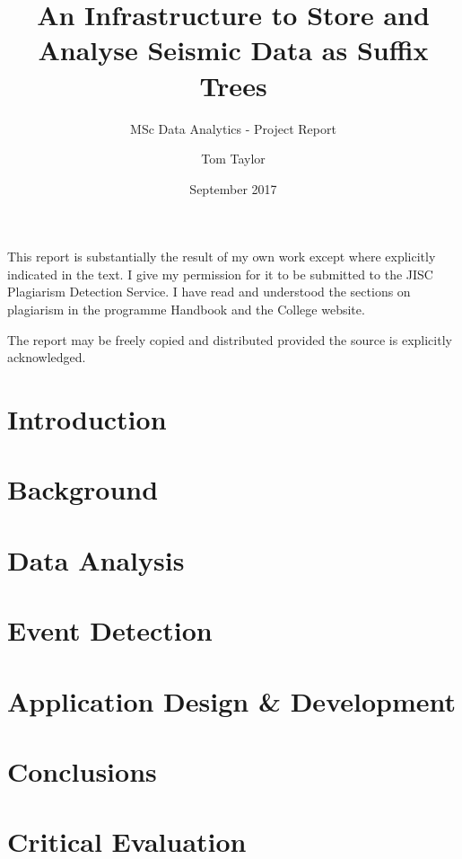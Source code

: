 \documentclass[11pt, a4paper]{scrartcl}
\title{\vspace{-3.0cm}An Infrastructure to Store and Analyse Seismic Data as Suffix Trees}
\subtitle{MSc Data Analytics - Project Report}
\date{September 2017}
\author{Tom Taylor}
\begin{document}
	\maketitle
\begin{itshape}
		\noindent This report is substantially the result of my own work except where explicitly indicated in the text. I give my permission for it to be submitted to the JISC Plagiarism Detection Service. I have read and understood the sections on plagiarism in the programme Handbook and the College website.
		
		\noindent The report may be freely copied and distributed provided the source is explicitly acknowledged.
\end{itshape}
\tableofcontents
\newpage

\section{Introduction}


\section{Background}




\section{Data Analysis}






\section{Event Detection}


\section{Application Design \& Development}


\section{Conclusions}

\section{Critical Evaluation}



	
\end{document}
